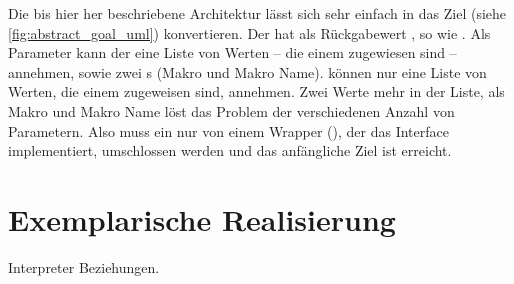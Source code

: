       Die bis hier her beschriebene Architektur lässt sich sehr einfach in das Ziel (siehe \autoref{fig:abstract_goal_uml}) konvertieren. %
      Der  hat als Rückgabewert , so wie . Als Parameter kann der  eine Liste von  Werten -- die einem  zugewiesen sind -- annehmen, sowie zwei s (Makro und Makro Name).  können nur eine Liste von  Werten, die einem  zugeweisen sind, annehmen. Zwei  Werte mehr in der Liste, als Makro und Makro Name löst das Problem der verschiedenen Anzahl von Parametern. Also muss ein  nur von einem Wrapper (), der das  Interface implementiert, umschlossen werden und das anfängliche Ziel ist erreicht.

\section{Exemplarische Realisierung}
\label{sec:Exemplarische Realisierung}

  \begin{myCodeEnv}
    \centering
    \begin{minipage}{.9\textwidth}
      
    \end{minipage}
    \caption{Interpreter Beziehungen.}
    \label{fig:ex_macro}
  \end{myCodeEnv}


